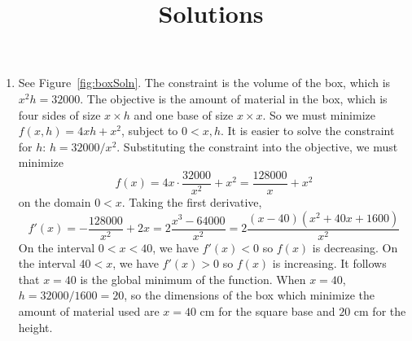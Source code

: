 \documentclass{article}
\title{\commonPSTitleZeroThreeSeven\ Solutions}
\author{\commonAuthor}
\date{\commonDateZeroThreeSeven}
\begin{document}
\maketitle
\begin{enumerate}
\item %
  See Figure~\ref{fig:boxSoln}.  The constraint is the volume of the
  box, which is $x^2h=32000$.  The objective is the amount of material
  in the box, which is four sides of size $x\times h$ and one base of
  size $x \times x$.  So we must minimize $f(x,h)=4xh + x^2$, subject
  to $0<x,h$.  It is easier to solve the constraint for $h$:
  $h=32000/x^2$.  Substituting the constraint into the objective, we
  must minimize
  \begin{displaymath}
    f(x) = 4x\cdot \frac{32000}{x^2} + x^2
    = \frac{128000}{x} + x^2
  \end{displaymath}
  on the domain $0<x$.  Taking the first derivative,
  \begin{displaymath}
    f'(x) = -\frac{128000}{x^2} + 2x = 2\frac{x^3-64000}{x^2}
    = 2 \frac{(x-40)(x^2+40x+1600)}{x^2}
  \end{displaymath}
  On the interval $0<x<40$, we have $f'(x)<0$ so $f(x)$ is decreasing.
  On the interval $40<x$, we have $f'(x)>0$ so $f(x)$ is increasing.
  It follows that $x=40$ is the global minimum of the function.  When
  $x=40$, $h=32000/1600=20$, so the dimensions of the box which
  minimize the amount of material used are $x=40$ cm for the square
  base and $20$ cm for the height.
  \begin{figure}[htbp]
    \centering
\end{figure}
\end{enumerate}
\end{document}
